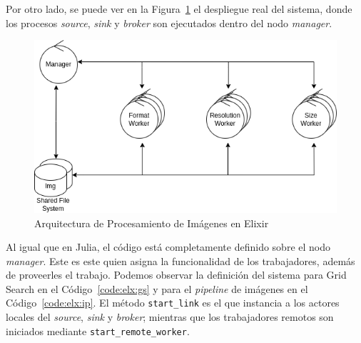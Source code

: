 \documentclass[11pt]{article}
\newcommand{\english}[1]{\textit{#1}}
\begin{document}
Por otro lado, se puede ver en la Figura~\ref{fig:elx:image_processing_arch} el despliegue real del sistema, donde los procesos \english{source}, \english{sink} y \english{broker} son ejecutados dentro del nodo \english{manager}.

\begin{figure}[ht]
    \centering
    \includegraphics[scale=0.4]{resources/distributed_systems/elixir/image_processing_arch.png}
    \caption{Arquitectura de Procesamiento de Imágenes en Elixir}
    \label{fig:elx:image_processing_arch}
\end{figure}

Al igual que en Julia, el código está completamente definido sobre el nodo \english{manager}. Este es este quien asigna la funcionalidad de los trabajadores, además de proveerles el trabajo. Podemos observar la definición del sistema para Grid Search en el Código~\ref{code:elx:gs} y para el \english{pipeline} de imágenes en el Código~\ref{code:elx:ip}. El método \lstinline{start_link} es el que instancia a los actores locales del \english{source}, \english{sink} y \english{broker}; mientras que los trabajadores remotos son iniciados mediante \lstinline{start_remote_worker}.
\end{document}
